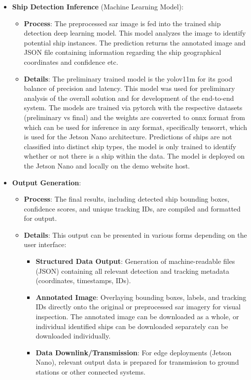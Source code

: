 \documentclass{article}
\begin{document}
\begin{itemize}
\begin{itemize}
\begin{itemize}
            Description: The preprocessed grayscale image is converted into a normalized \acrshort{numpy} array with pixel values scaled between 0 and 1 for direct input to the deep learning model. \end{itemize}
    \end{itemize}
    \item \textbf{Ship Detection Inference} (Machine Learning Model):
        \begin{itemize}
            \item \textbf{Process}: The preprocessed \acrshort{sar} image is fed into the trained ship detection deep learning model. This model analyzes the image to identify potential ship instances. The prediction returns the annotated image and JSON file containing information regarding the ship geographical coordinates and confidence etc.
            \item \textbf{Details}: The preliminary trained model is the \acrshort{yolov11m} for its good balance of precision and latency. This model was used for preliminary analysis of the overall solution and for development of the end-to-end system. The models are trained via \acrshort{pytorch} with the respective datasets (preliminary vs final) and the weights are converted to \acrshort{onnx} format from which can be used for inference in any format, specifically \acrshort{tensorrt}, which is used for the Jetson Nano architecture. Predictions of ships are not classified into distinct ship types, the model is only trained to identify whether or not there is a ship within the data. The model is deployed on the Jetson Nano and locally on the demo website host. \end{itemize}
    \item \textbf{Output Generation}:
    \begin{itemize}
        \item \textbf{Process}: The final results, including detected ship bounding boxes, confidence scores, and unique tracking IDs, are compiled and formatted for output. \item \textbf{Details}: This output can be presented in various forms depending on the user interface:
        \begin{itemize}
            \item \textbf{Structured Data Output}: Generation of machine-readable files (JSON) containing all relevant detection and tracking metadata (coordinates, timestamps, IDs). \item \textbf{Annotated Image}: Overlaying bounding boxes, labels, and tracking IDs directly onto the original or preprocessed \acrshort{sar} imagery for visual inspection. The annotated image can be downloaded as a whole, or individual identified ships can be downloaded separately can be downloaded individually. \item \textbf{Data Downlink/Transmission}: For edge deployments (Jetson Nano), relevant output data is prepared for transmission to ground stations or other connected systems. \end{itemize}

\end{itemize}
\end{itemize}
\end{document}
